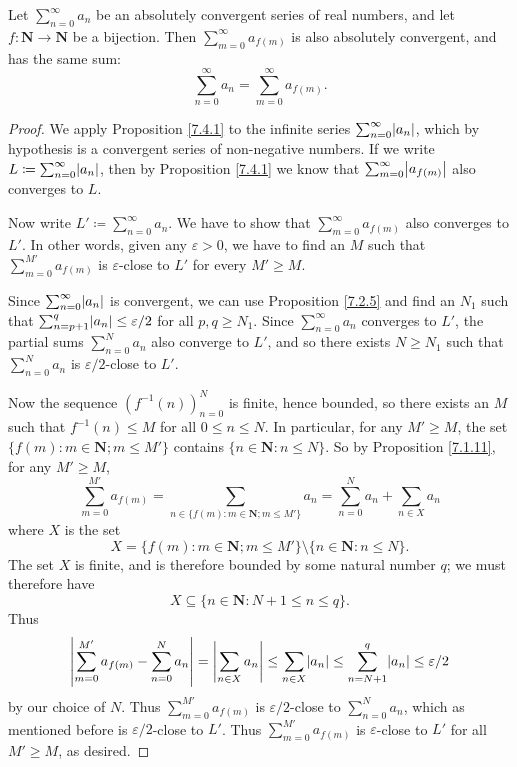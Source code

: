 \setcounter{theorem}{2}
\begin{proposition}\label{7.4.3}
    Let \(\sum_{n = 0}^\infty a_n\) be an absolutely convergent series of real numbers, and let \(f : \mathbf{N} \to \mathbf{N}\) be a bijection.
    Then \(\sum_{m = 0}^\infty a_{f(m)}\) is also absolutely convergent, and has the same sum:
    \[
        \sum_{n = 0}^\infty a_n = \sum_{m = 0}^\infty a_{f(m)}.
    \]
\end{proposition}

\begin{proof}
    We apply Proposition \ref{7.4.1} to the infinite series \(\sum_{n = 0}^\infty \abs*{a_n}\), which by hypothesis is a convergent series of non-negative numbers.
    If we write \(L \coloneqq \sum_{n = 0}^\infty \abs*{a_n}\), then by Proposition \ref{7.4.1} we know that \(\sum_{m = 0}^\infty \abs*{a_{f(m)}}\) also converges to \(L\).

    Now write \(L' \coloneqq \sum_{n = 0}^\infty a_n\).
    We have to show that \(\sum_{m = 0}^\infty a_{f(m)}\) also converges to \(L'\).
    In other words, given any \(\varepsilon > 0\), we have to find an \(M\) such that \(\sum_{m = 0}^{M'} a_{f(m)}\) is \(\varepsilon\)-close to \(L'\) for every \(M' \geq M\).

    Since \(\sum_{n = 0}^\infty \abs*{a_n}\) is convergent, we can use Proposition \ref{7.2.5} and find an \(N_1\) such that \(\sum_{n = p + 1}^q \abs*{a_n} \leq \varepsilon / 2\) for all \(p, q \geq N_1\).
    Since \(\sum_{n = 0}^\infty a_n\) converges to \(L'\), the partial sums \(\sum_{n = 0}^N a_n\) also converge to \(L'\), and so there exists \(N \geq N_1\) such that \(\sum_{n = 0}^N a_n\) is \(\varepsilon / 2\)-close to \(L'\).

    Now the sequence \((f^{-1}(n))_{n = 0}^N\) is finite, hence bounded, so there exists an \(M\) such that \(f^{-1}(n) \leq M\) for all \(0 \leq n \leq N\).
    In particular, for any \(M' \geq M\), the set \(\{f(m) : m \in \mathbf{N}; m \leq M'\}\) contains \(\{n \in \mathbf{N} : n \leq N\}\).
    So by Proposition \ref{7.1.11}, for any \(M' \geq M\),
    \[
        \sum_{m = 0}^{M'} a_{f(m)} = \sum_{n \in \{f(m) : m \in \mathbf{N}; m \leq M'\}} a_n = \sum_{n = 0}^N a_n + \sum_{n \in X} a_n
    \]
    where \(X\) is the set
    \[
        X = \{f(m) : m \in \mathbf{N}; m \leq M'\} \setminus \{n \in \mathbf{N} : n \leq N\}.
    \]
    The set \(X\) is finite, and is therefore bounded by some natural number \(q\);
    we must therefore have
    \[
        X \subseteq \{n \in \mathbf{N} : N + 1 \leq n \leq q\}.
    \]
    Thus
    \[
        \abs*{\sum_{m = 0}^{M'} a_{f(m)} - \sum_{n = 0}^N a_n} = \abs*{\sum_{n \in X} a_n} \leq \sum_{n \in X} \abs*{a_n} \leq \sum_{n = N + 1}^q \abs*{a_n} \leq \varepsilon / 2
    \]
    by our choice of \(N\).
    Thus \(\sum_{m = 0}^{M'} a_{f(m)}\) is \(\varepsilon / 2\)-close to \(\sum_{n = 0}^N a_n\), which as mentioned before is \(\varepsilon / 2\)-close to \(L'\).
    Thus \(\sum_{m = 0}^{M'} a_{f(m)}\) is \(\varepsilon\)-close to \(L'\) for all \(M' \geq M\), as desired.
\end{proof}

